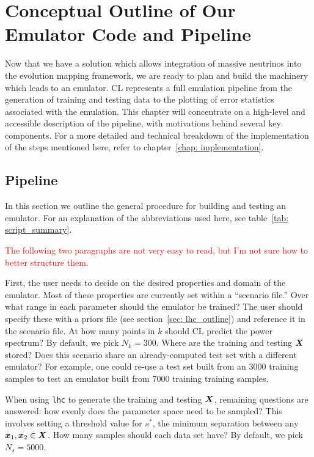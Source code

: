\chapter{Conceptual Outline of Our Emulator Code and Pipeline}
\label{chap: cassL}

Now that we have a solution which allows integration of massive neutrinos
into the evolution mapping framework, we are ready to plan and build the
machinery which leads to an emulator. CL represents a full emulation pipeline from the generation of training and 
testing data to the plotting of error statistics associated with
the emulation. This chapter will concentrate on a high-level and accessible 
description of the pipeline, with motivations behind several key components.
For a more detailed and technical breakdown of the implementation of the steps
mentioned here, refer to chapter~\ref{chap: implementation}.


\section{Pipeline}
\label{sec: flow_chart}


In this section we outline the general procedure for building and testing an
emulator. For an explanation of the abbreviations used here, see table~\ref{tab: script_summary}. 

\textcolor{red}{The following two paragraphs are not very easy to read, but 
I'm not sure how to better structure them.}

First, the user needs to decide on the desired properties and domain of the
emulator. Most of these properties are currently set within a ``scenario
file.'' Over what range in each parameter should the emulator be trained?
The user should specify these with a priors file (see section~\ref{sec: 
lhc_outline}) and reference it in the scenario file. At how many points in
$k$ should CL predict the power spectrum? By default, we pick $N_k = 300$. 
Where are the training and testing $\bm{X}$ stored?
Does this scenario share an
already-computed test set with a different emulator? For example, one could
re-use a test set built from an 3000 training samples to test an emulator 
built from 7000 training training samples.

When using \texttt{lhc} to generate the training and testing
$\bm{X}$, remaining questions are answered: how evenly does the parameter
space need to be sampled? This involves setting a threshold value for $s^*$,
the minimum separation between any $\bm{x}_1, \bm{x}_2 \in \bm{X}$.
How many samples should each data set have? By default, we pick $N_s = 5000$.

